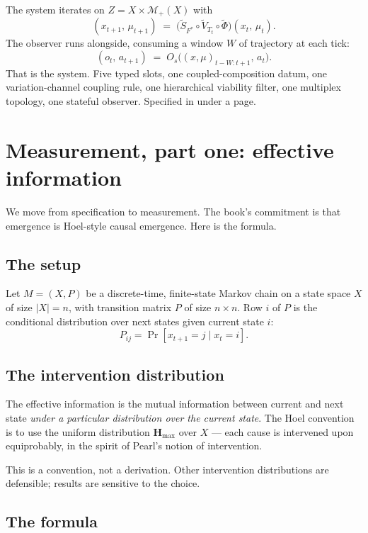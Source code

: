 The system iterates on $Z = X \times \mathcal{M}_+(X)$ with
\[
  (x_{t+1},\, \mu_{t+1}) \;=\;
  \big(\widetilde S_{F^*} \circ \widetilde V_{T_t} \circ
       \widetilde\Phi\big)(x_t,\, \mu_t).
\]
The observer runs alongside, consuming a window $W$ of trajectory at
each tick:
\[
  (o_t,\, a_{t+1}) \;=\;
  O_s\!\big((x,\mu)_{t-W:t+1},\, a_t\big).
\]
That is the system. Five typed slots, one coupled-composition
datum, one variation-channel coupling rule, one hierarchical viability
filter, one multiplex topology, one stateful observer. Specified in
under a page.

\section{Measurement, part one: effective information}

We move from specification to measurement. The book's commitment is
that emergence is Hoel-style causal emergence. Here is the formula.

\subsection*{The setup}

Let $M = (X, P)$ be a discrete-time, finite-state Markov chain on a
state space $X$ of size $|X| = n$, with transition matrix $P$ of size
$n \times n$. Row $i$ of $P$ is the conditional distribution over
next states given current state $i$:
\[
  P_{ij} = \Pr[x_{t+1} = j \mid x_t = i].
\]

\subsection*{The intervention distribution}

The effective information is the mutual information between current
and next state \emph{under a particular distribution over the current
state}. The Hoel convention is to use the uniform distribution
$\mathbf{H}_{\max}$ over $X$ --- each cause is intervened upon
equiprobably, in the spirit of Pearl's notion of intervention.

This is a convention, not a derivation. Other intervention
distributions are defensible; results are sensitive to the choice.

\subsection*{The formula}

